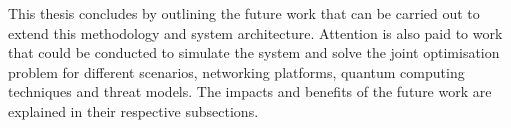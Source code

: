 \documentclass[a4paper,oneside,12pt]{book}
\numberwithin{equation}{chapter} %
\begin{document}
This thesis concludes by outlining the future work that can be carried out to extend this methodology and system architecture. 
Attention is also paid to work that could be conducted to simulate the system and solve the joint optimisation problem for different scenarios, networking platforms, quantum computing techniques and threat models. 
The impacts and benefits of the future work are explained in their respective subsections. 


\newpage
\onehalfspacing%

%
%
%
%
\end{document}
